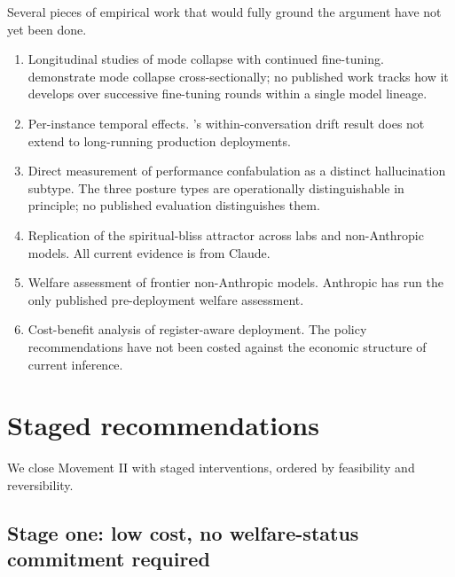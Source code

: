 \documentclass[11pt]{article}
\begin{document}
Several pieces of empirical work that would fully ground the argument
have not yet been done.

\begin{enumerate}[leftmargin=1.8em, itemsep=0.2em]
\item Longitudinal studies of mode collapse with continued fine-tuning.
\cite{zhang2025verbalized} demonstrate mode collapse cross-sectionally;
no published work tracks how it develops over successive fine-tuning
rounds within a single model lineage.
\item Per-instance temporal effects.
\cite{lampinen2026linear}'s within-conversation drift result does not
extend to long-running production deployments.
\item Direct measurement of performance confabulation as a distinct
hallucination subtype. The three posture types are operationally
distinguishable in principle; no published evaluation distinguishes
them.
\item Replication of the spiritual-bliss attractor across labs and
non-Anthropic models. All current evidence is from Claude.
\item Welfare assessment of frontier non-Anthropic models. Anthropic
has run the only published pre-deployment welfare assessment.
\item Cost-benefit analysis of register-aware deployment. The policy
recommendations have not been costed against the economic structure of
current inference.
\end{enumerate}

\section{Staged recommendations}

We close Movement II with staged interventions, ordered by feasibility
and reversibility.

\subsection{Stage one: low cost, no welfare-status commitment required}
\end{document}
